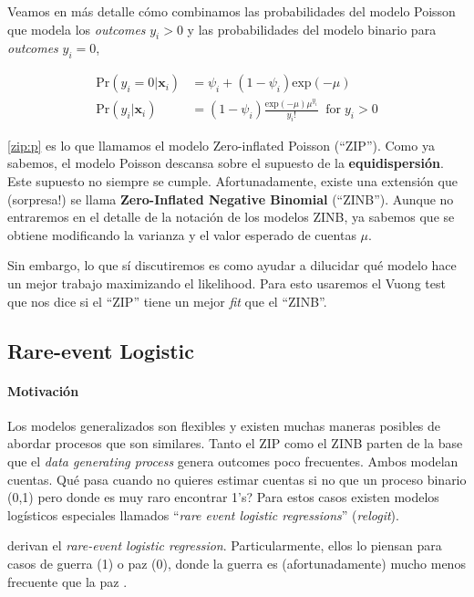\documentclass[onesided]{article}\usepackage[]{graphicx}\usepackage[]{color}
\begin{document}
Veamos en m\'as detalle c\'omo combinamos las probabilidades del modelo Poisson que modela los \emph{outcomes} $y_{i}>0$ y las probabilidades del modelo binario para \emph{outcomes} $y_{i}=0$,

\begin{equation}\label{zip:p}
\begin{split}
\text{Pr}(y_{i}=0|\boldsymbol{x}_{i}) &= \psi_{i}+(1-\psi_{i})\text{exp}(-\mu)\\
\text{Pr}(y_{i}|\boldsymbol{x}_{i}) &= (1-\psi_{i})\frac{\text{exp}(-\mu)\mu^{y_{i}}}{y_{i}!} \;\; \text{for} \; y_{i}>0
\end{split}
\end{equation}

\autoref{zip:p} es lo que llamamos el modelo Zero-inflated Poisson (``ZIP''). Como ya sabemos, el modelo Poisson descansa sobre el supuesto de la {\bf equidispersi\'on}. Este supuesto no siempre se cumple. Afortunadamente, existe una extensi\'on que (sorpresa!) se llama {\bf Zero-Inflated Negative Binomial} (``ZINB''). Aunque no entraremos en el detalle de la notaci\'on de los modelos ZINB, ya sabemos que se obtiene modificando la varianza y el valor esperado de cuentas $\mu$.

Sin embargo, lo que s\'i discutiremos es como ayudar a dilucidar qu\'e modelo hace un mejor trabajo maximizando el likelihood. Para esto usaremos el Vuong test que nos dice si el ``ZIP'' tiene un mejor \emph{fit} que el ``ZINB''.




\subsection{Rare-event Logistic}

\paragraph{Motivaci\'on} Los modelos generalizados son flexibles y existen muchas maneras posibles de abordar procesos que son similares. Tanto el ZIP como el ZINB parten de la base que el \emph{data generating process} genera outcomes poco frecuentes. Ambos modelan cuentas. Qu\'e pasa cuando no quieres estimar cuentas si no que un proceso binario (0,1) pero donde es muy raro encontrar 1's? Para estos casos existen modelos log\'isticos especiales llamados ``\emph{rare event logistic regressions}'' (\emph{relogit}).

\textcite{King2001} derivan el \emph{rare-event logistic regression}. Particularmente, ellos lo piensan para casos de guerra (1) o paz (0), donde la guerra es (afortunadamente) mucho menos frecuente que la paz \parencite{King2001a}.
\end{document}
